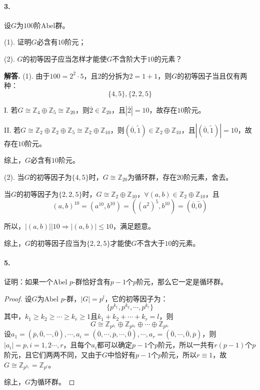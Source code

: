 \documentclass[12pt, a4paper, oneside]{ctexart}
\newenvironment{solution}{\par\noindent\textbf{解答. }}{\bigskip\par}
\begin{document}
\paragraph{3.}设$G$为$100$阶$\text{Abel}$群。

(1). 证明$G$必含有$10$阶元；

(2). $G$的初等因子应当怎样才能使$G$不含阶大于$10$的元素？

\begin{solution}
(1). 由于$100=2^2\cdot 5$，且$2$的分拆为$2=1+1$，则$G$的初等因子当且仅有两种：
\begin{equation*}
    \{4,5\},\{2,2,5\}
\end{equation*}

I. 若$G\cong \mathbb{Z}_4\oplus\mathbb{Z}_5\cong \mathbb{Z}_{20}$，则$\overline{2}\in \mathbb{Z}_{20}$，且$|\overline{2}|=10$，故存在$10$阶元。

II. 若$G\cong\mathbb{Z}_2\oplus\mathbb{Z}_2\oplus\mathbb{Z}_5\cong\mathbb{Z}_2\oplus\mathbb{Z}_{10}$，则$(\overline{0},\tilde{1})\in \mathbb{Z}_2\oplus\mathbb{Z}_{10}$，且$|(\overline{0},\tilde{1})| = 10$，故存在$10$阶元。

综上，$G$必含有$10$阶元。

(2). 当$G$的初等因子为$\{4,5\}$时，$G\cong \mathbb{Z}_{20}$为循环群，存在$20$阶元素，舍去。

当$G$的初等因子为$\{2,2,5\}$时，$G\cong\mathbb{Z}_{2}\oplus\mathbb{Z}_{10}$，$\forall (a,b)\in\mathbb{Z}_{2}\oplus\mathbb{Z}_{10}$，且
\begin{equation*}
    (a,b)^{10} = (a^{10},b^{10}) = ((a^2)^5,b^{10}) = (\overline{0},\tilde{0})
\end{equation*}

所以，$|(a,b)|\biggl|10\Rightarrow |(a,b)|\leqslant 10$，满足题意。

综上，$G$的初等因子应当为$\{2,2,5\}$才能使$G$不含大于$10$的元素。
\end{solution}
\paragraph{5.}证明：如果一个$\text{Abel }p\text{-群}$恰好含有$p-1$个$p$阶元，那么它一定是循环群。
\begin{proof}
    设$G$为$\text{Abel }p\text{-群}$，$|G|=p^l$，它的初等因子为：
    \begin{equation*}
        \{p^{k_1},p^{k_2},\cdots,p^{k_r}\}
    \end{equation*}
    其中，$k_1\geqslant k_2\geqslant \cdots\geqslant k_r\geqslant 1$且$k_1+k_2+\cdots+k_r=l$，则
    \begin{equation*}
        G\cong \mathbb{Z}_{p^{k_1}}\oplus\mathbb{Z}_{p^{k_2}}\oplus\cdots\oplus\mathbb{Z}_{p^{k_r}}
    \end{equation*}
    设$a_1=(\overline{p},\overline{0},\cdots,\overline{0}), \cdots,a_i = (\overline{0},\cdots,\overline{p},\cdots,\overline{0}),\cdots,a_r=(\overline{0},\cdots,\overline{0},\overline{p})$，则$|a_i|=p,i=1,2\cdots,r$，且每个$a_i$都可以确定$p-1$个$p$阶元，所以一共有$r(p-1)$个$p$阶元，且它们两两不同，又由于$G$中恰好有$p-1$个$p$阶元，所以$r\equiv 1$，故$G\cong\mathbb{Z}_{p^{k_1}}=\mathbb{Z}_{p^l}$。
    
    综上，$G$为循环群。
\end{proof}
\end{document}
